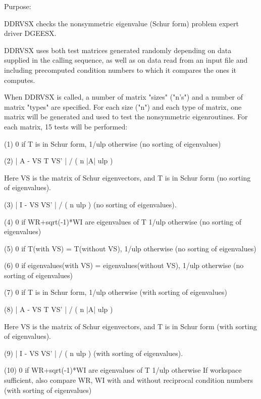 \begin{DoxyParagraph}{Purpose\+: }
\begin{DoxyVerb}    DDRVSX checks the nonsymmetric eigenvalue (Schur form) problem
    expert driver DGEESX.

    DDRVSX uses both test matrices generated randomly depending on
    data supplied in the calling sequence, as well as on data
    read from an input file and including precomputed condition
    numbers to which it compares the ones it computes.

    When DDRVSX is called, a number of matrix "sizes" ("n's") and a
    number of matrix "types" are specified.  For each size ("n")
    and each type of matrix, one matrix will be generated and used
    to test the nonsymmetric eigenroutines.  For each matrix, 15
    tests will be performed:

    (1)     0 if T is in Schur form, 1/ulp otherwise
           (no sorting of eigenvalues)

    (2)     | A - VS T VS' | / ( n |A| ulp )

      Here VS is the matrix of Schur eigenvectors, and T is in Schur
      form  (no sorting of eigenvalues).

    (3)     | I - VS VS' | / ( n ulp ) (no sorting of eigenvalues).

    (4)     0     if WR+sqrt(-1)*WI are eigenvalues of T
            1/ulp otherwise
            (no sorting of eigenvalues)

    (5)     0     if T(with VS) = T(without VS),
            1/ulp otherwise
            (no sorting of eigenvalues)

    (6)     0     if eigenvalues(with VS) = eigenvalues(without VS),
            1/ulp otherwise
            (no sorting of eigenvalues)

    (7)     0 if T is in Schur form, 1/ulp otherwise
            (with sorting of eigenvalues)

    (8)     | A - VS T VS' | / ( n |A| ulp )

      Here VS is the matrix of Schur eigenvectors, and T is in Schur
      form  (with sorting of eigenvalues).

    (9)     | I - VS VS' | / ( n ulp ) (with sorting of eigenvalues).

    (10)    0     if WR+sqrt(-1)*WI are eigenvalues of T
            1/ulp otherwise
            If workspace sufficient, also compare WR, WI with and
            without reciprocal condition numbers
            (with sorting of eigenvalues)


\end{DoxyVerb}
\end{DoxyParagraph}
